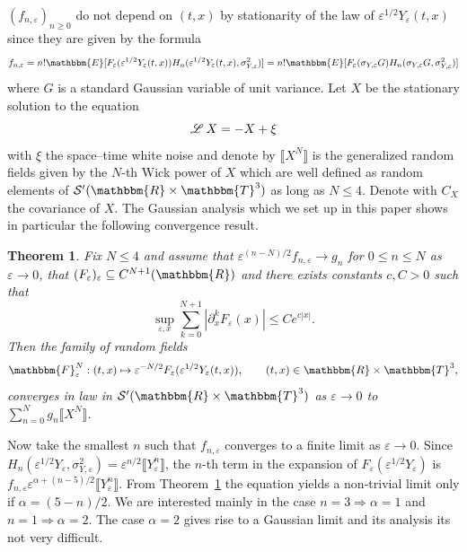 \documentclass[a4paper,11pt]{article}
\newtheorem{theorem}{Theorem}
\newcommand{\LL}{\mathscr{L} \hspace{.2em}}
\begin{document}
$(f_{n, \varepsilon})_{n \geqslant 0}$ do not depend on $(t, x)$ by
stationarity of the law of $\varepsilon^{1 / 2} Y_{\varepsilon} (t, x)$ since
they are given by the formula
\[ f_{n, \varepsilon} = n!\mathbbm{E} [F_{\varepsilon} (\varepsilon^{1 / 2}
   Y_{\varepsilon} (t, x)) H_n (\varepsilon^{1 / 2} Y_{\varepsilon} (t, x),
   \sigma_{Y, \varepsilon}^2)] = n!\mathbbm{E} [F_{\varepsilon} (\sigma_{Y,
   \varepsilon} G) H_n (\sigma_{Y, \varepsilon} G, \sigma_{Y, \varepsilon}^2)]
\]
where $G$ is a standard Gaussian variable of unit variance. Let $X$ be the
stationary solution to the equation
\[ \LL X = - X + \xi \]
with $\xi$ the space--time white noise and denote by $\llbracket X^N
\rrbracket$ is the generalized random fields given by the $N$-th Wick power of
$X$ which are well defined as random elements of $\mathcal{S}' (\mathbbm{R}
\times \mathbbm{T}^3)$ as long as $N \leqslant 4$. Denote with $C_X$ the
covariance of $X$. The Gaussian analysis which we set up in this paper shows
in particular the following convergence result.

\begin{theorem}
  \label{th:gaussianAnalysis}Fix $N \leqslant 4$ and assume that
  $\varepsilon^{(n - N) / 2} f_{n, \varepsilon} \rightarrow g_n$ for $0
  \leqslant n \leqslant N$ as $\varepsilon \rightarrow 0$, that
  $(F_{\varepsilon})_{\varepsilon} \subseteq C^{N + 1} (\mathbbm{R})$ and
  there exists constants $c, C > 0$ such that
  \[ \sup_{\varepsilon, x} \sum_{k = 0}^{N + 1} | \partial_x^k F_{\varepsilon}
     (x) | \leqslant C e^{c | x |} . \]
  Then the family of random fields
  \[ \mathbbm{F}^N_{\varepsilon} : (t, x) \mapsto \varepsilon^{- N / 2}
     F_{\varepsilon} (\varepsilon^{1 / 2} Y_{\varepsilon} (t, x)), \qquad (t,
     x) \in \mathbbm{R} \times \mathbbm{T}^3, \]
  converges in law in $\mathcal{S}' (\mathbbm{R} \times \mathbbm{T}^3)$ as
  $\varepsilon \rightarrow 0$ to $\sum_{n = 0}^N g_n \llbracket X^N
  \rrbracket$.
\end{theorem}

Now take the smallest $n$ such that $f_{n, \varepsilon}$ converges to a finite
limit as $\varepsilon \rightarrow 0$. Since $H_n (\varepsilon^{1 / 2}
Y_{\varepsilon}, \sigma_{Y, \varepsilon}^2) = \varepsilon^{n / 2} \llbracket
Y_{\varepsilon}^n \rrbracket$, the $n$-th term in the expansion of
$F_{\varepsilon} (\varepsilon^{1 / 2} Y_{\varepsilon})$ is $f_{n, \varepsilon}
\varepsilon^{\alpha + (n - 5) / 2} \llbracket Y_{\varepsilon}^n \rrbracket$.
From Theorem~\ref{th:gaussianAnalysis} the equation yields a non-trivial limit
only if $\alpha = (5 - n) / 2$. We are interested mainly in the case $n = 3
\Rightarrow \alpha = 1$ and $n = 1 \Rightarrow \alpha = 2$. The case $\alpha =
2$ gives rise to a Gaussian limit and its analysis its not very difficult.
\end{document}
